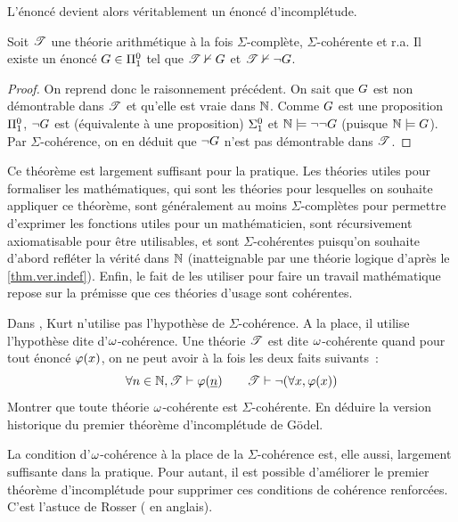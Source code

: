 \noindent
L'énoncé devient alors véritablement un énoncé d'incomplétude.

\begin{theorem}\label{thm.godel.incompl1}
  Soit $\mathscr T$ une théorie arithmétique à la fois $\Sigma$-complète,
  $\Sigma$-cohérente et r.a. Il existe un énoncé $G \in \Pi^0_{1}$ tel
  que $\mathscr T \nvdash G$ et $\mathscr T \nvdash \lnot G$.
\end{theorem}

\begin{proof}
  On reprend donc le raisonnement précédent. On sait que $G$ est non
  démontrable dans $\mathscr T$ et qu'elle est vraie dans $\mathbb N$. Comme $G$ est
  une proposition $\Pi^0_{1}$, $\lnot G$ est (équivalente à une
  proposition) $\Sigma^0_{1}$ et $\mathbb N \models \lnot\lnot G$ (puisque
  $\mathbb N\models G$). Par $\Sigma$-cohérence, on en déduit que $\lnot G$
  n'est pas démontrable dans $\mathscr T$.
\end{proof}

Ce théorème est largement suffisant pour la pratique. Les théories utiles pour
formaliser les mathématiques, qui sont les théories pour lesquelles on souhaite
appliquer ce théorème, sont généralement au moins $\Sigma$-complètes pour
permettre d'exprimer les fonctions utiles pour un mathématicien, sont
récursivement axiomatisable pour être utilisables, et sont $\Sigma$-cohérentes
puisqu'on souhaite d'abord refléter la vérité dans $\mathbb N$ (inatteignable par une
théorie logique d'après le \cref{thm.ver.indef}). Enfin, le fait de les
utiliser pour faire un travail mathématique repose sur la prémisse que ces
théories d'usage sont cohérentes.

\begin{exercise}
  Dans \cite{Goedel1931}, Kurt  n'utilise pas l'hypothèse de
  $\Sigma$-cohérence. A la place, il utilise l'hypothèse dite
  d'$\omega$-cohérence. Une théorie $\mathscr T$ est dite $\omega$-cohérente
  quand pour tout énoncé $\varphi(x)$, on ne peut avoir à la fois les deux
  faits suivants~:
  \[\forall n \in \mathbb N, \mathscr T \vdash \varphi(\underline{n}) \qquad
  \mathscr T \vdash \lnot(\forall x, \varphi(x))\]
  Montrer que toute théorie $\omega$-cohérente est $\Sigma$-cohérente. En
  déduire la version historique du premier théorème d'incomplétude de Gödel.
\end{exercise}

La condition d'$\omega$-cohérence à la place de la $\Sigma$-cohérence est, elle
aussi, largement suffisante dans la pratique. Pour autant, il est possible
d'améliorer le premier théorème d'incomplétude pour supprimer ces conditions
de cohérence renforcées. C'est l'astuce de Rosser (
en anglais).

